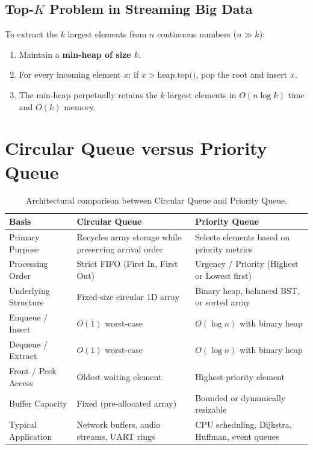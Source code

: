 \subsection{Top-$K$ Problem in Streaming Big Data}
To extract the $k$ largest elements from $n$ continuous numbers ($n \gg k$):
\begin{enumerate}
    \item Maintain a \textbf{min-heap of size $k$}.
    \item For every incoming element $x$: if $x > \text{heap.top()}$, pop the root and insert $x$.
    \item The min-heap perpetually retains the $k$ largest elements in $O(n \log k)$ time and $O(k)$ memory.
\end{enumerate}

\section{Circular Queue versus Priority Queue}

\begin{table}[htbp]
\centering
\small
\begin{tabularx}{\textwidth}{l X X}
\toprule
\textbf{Basis} & \textbf{Circular Queue} & \textbf{Priority Queue} \\
\midrule
Primary Purpose       & Recycles array storage while preserving arrival order & Selects elements based on priority metrics \\
Processing Order      & Strict FIFO (First In, First Out)                    & Urgency / Priority (Highest or Lowest first) \\
Underlying Structure  & Fixed-size circular 1D array                         & Binary heap, balanced BST, or sorted array \\
Enqueue / Insert      & $O(1)$ worst-case                                    & $O(\log n)$ with binary heap \\
Dequeue / Extract     & $O(1)$ worst-case                                    & $O(\log n)$ with binary heap \\
Front / Peek Access   & Oldest waiting element                               & Highest-priority element \\
Buffer Capacity       & Fixed (pre-allocated array)                          & Bounded or dynamically resizable \\
Typical Application   & Network buffers, audio streams, UART rings           & CPU scheduling, Dijkstra, Huffman, event queues \\
\bottomrule
\end{tabularx}
\caption{Architectural comparison between Circular Queue and Priority Queue.}
\end{table}

